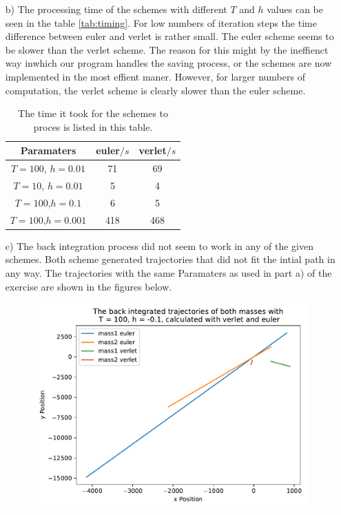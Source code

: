\begin{itemize}
    \item[b)]
    The processing time of the schemes with different $T$ and $h$ values can be seen in the table \autoref{tab:timing}.
    For low numbers of iteration steps the time difference between euler and verlet is rather small.
    The euler scheme seems to be slower than the verlet scheme.
    The reason for this might by the ineffienct way inwhich our program handles the saving process, or the schemes are now implemented in the most effient maner.
    However, for larger numbers of computation, the verlet scheme is clearly slower than the euler scheme.
    \begin{table}
        \centering
        \caption{The time it took for the schemes to proces is listed in this table.
        }
        \begin{tabular}{ccc}
        \toprule
           Paramaters & euler$/s$ & verlet$/s$ \\
           \midrule
            $T=100$, $h=0.01$ & 71 & 69 \\ 
            $T=10$, $h=0.01$ & 5 & 4 \\
            $T=100$,$h=0.1$ & 6 & 5 \\
            $T=100$,$h=0.001$ & 418 & 468\\
           \bottomrule
        \end{tabular}
        \label{tab:timing}
    \end{table}
\FloatBarrier
    \item[c)]
    The back integration process did not seem to work in any of the given schemes.
    Both scheme generated trajectories that did not fit the intial path in any way.
    The trajectories with the same Paramaters as used in part a) of the exercise are shown in the figures below.
    \begin{figure}
        \centering
        \includegraphics[width=\textwidth]{plots/plotsT_100_01/plotd.pdf}

\end{figure}
\end{itemize}
